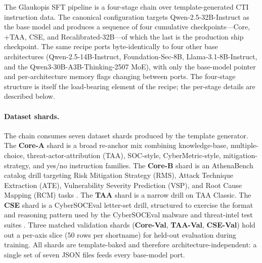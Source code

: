 \documentclass[unnumsec,webpdf,contemporary,large]{oup-authoring-template}
\theoremstyle{thmstyleone}
\theoremstyle{thmstyletwo}
\theoremstyle{thmstylethree}
\begin{document}
The Glaukopis SFT pipeline is a four-stage chain over template-generated CTI instruction data. The canonical configuration targets Qwen-2.5-32B-Instruct as the base model and produces a sequence of four cumulative checkpoints---Core, +TAA, CSE, and Recalibrated-32B---of which the last is the production ship checkpoint. The same recipe ports byte-identically to four other base architectures (Qwen-2.5-14B-Instruct, Foundation-Sec-8B, Llama-3.1-8B-Instruct, and the Qwen3-30B-A3B-Thinking-2507 MoE), with only the base-model pointer and per-architecture memory flags changing between ports. The four-stage structure is itself the load-bearing element of the recipe; the per-stage details are described below.

\paragraph{Dataset shards.}
The chain consumes seven dataset shards produced by the template generator. The \textbf{Core-A} shard is a broad re-anchor mix combining knowledge-base, multiple-choice, threat-actor-attribution (TAA), SOC-style, CyberMetric-style, mitigation-strategy, and yes/no instruction families. The \textbf{Core-B} shard is an AthenaBench catalog drill targeting Risk Mitigation Strategy (RMS), Attack Technique Extraction (ATE), Vulnerability Severity Prediction (VSP), and Root Cause Mapping (RCM) tasks \cite{alam2025athenabench}. The \textbf{TAA} shard is a narrow drill on TAA Classic. The \textbf{CSE} shard is a CyberSOCEval letter-set drill, structured to exercise the format and reasoning pattern used by the CyberSOCEval malware and threat-intel test suites \cite{cybersoceval2025}. Three matched validation shards (\textbf{Core-Val}, \textbf{TAA-Val}, \textbf{CSE-Val}) hold out a per-axis slice (50 rows per shortname) for held-out evaluation during training. All shards are template-baked and therefore architecture-independent: a single set of seven JSON files feeds every base-model port.
\end{document}
